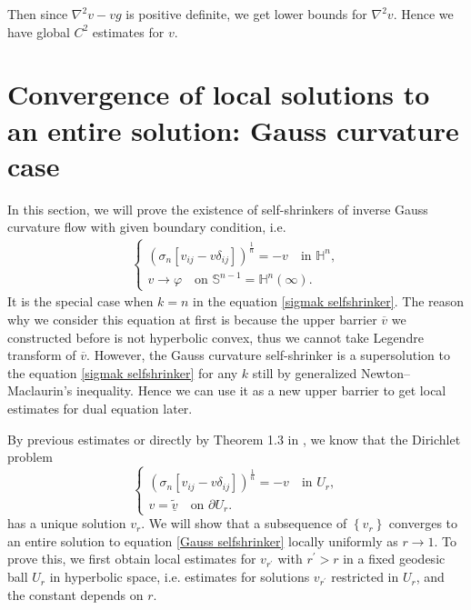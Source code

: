 \documentclass[reqno]{amsart}
\theoremstyle{remark}
\theoremstyle{definition}
\numberwithin{equation}{section}
\begin{document}
Then since $\nabla^2 v - vg$ is positive definite, we get lower bounds for $\nabla^2 v$. Hence we have global $C^2$ estimates for $v$.




\section{Convergence of local solutions to an entire solution: Gauss curvature case}

In this section, we will prove the existence of self-shrinkers of inverse Gauss curvature flow with given boundary condition, i.e.
\begin{align}
    \begin{cases}
        \left( {\sigma_n} \left[v_{ij}-v\delta_{ij}\right] \right)^{\frac{1}{n}} = - v \quad \text{in } \mathbb{H}^{n}, \\
        v \rightarrow \varphi \quad \text{on } \mathbb{S}^{n-1} = \mathbb{H}^{n}(\infty). \label{Gauss selfshrinker}
    \end{cases}
\end{align}
It is the special case when $k=n$ in the equation \eqref{sigmak selfshrinker}. The reason why we consider this equation at first is because the upper barrier $\overline{v}$ we constructed before is not hyperbolic convex, thus we cannot take Legendre transform of $\overline{v}$. However, the Gauss curvature self-shrinker is a supersolution to the equation \eqref{sigmak selfshrinker} for any $k$ still by generalized Newton--Maclaurin's inequality. Hence we can use it as a new upper barrier to get local estimates for dual equation later.

By previous estimates or directly by Theorem 1.3 in \cite{GuanBo}, we know that the Dirichlet problem
\begin{equation}
    \begin{cases} 
        \left( \sigma_n \left[v_{ij}-v\delta_{ij}\right] \right)^{\frac{1}{n}} = -v \quad \text{in } U_r, \\
        v = \tilde{\underline{v}} \quad \text{on } \partial U_r. \label{Ur Gauss selfshrinker}
    \end{cases}
\end{equation}
has a unique solution $v_r$. 
We will show that a subsequence of $\left\{ v_r \right\}$ converges to an entire solution to equation \eqref{Gauss selfshrinker} locally uniformly as $r \to 1$. 
To prove this, we first obtain local estimates for $v_{r^{\prime}}$ with $r^{\prime}>r$ in a fixed geodesic ball $U_r$ in hyperbolic space, i.e. estimates for solutions $v_{r^{\prime}}$ restricted in $U_r$, and the constant depends on $r$.
\end{document}
